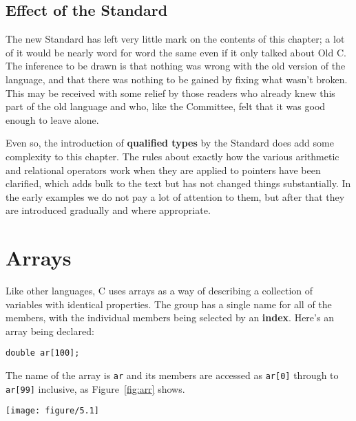   

  \subsection{Effect of the Standard}
   

   The new Standard has left very little mark on the contents of this
    chapter; a lot of it would be nearly word for word the same even if it
    only talked about Old C. The inference to be drawn is that nothing was
    wrong with the old version of the language, and that there was nothing
    to be gained by fixing what wasn't broken. This may be received with
    some relief by those readers who already knew this part of the old
    language and who, like the Committee, felt that it was good enough to
    leave alone.


   Even so, the introduction of \textbf{qualified types} by the
    Standard does add some complexity to this chapter. The rules about
    exactly how the various arithmetic and relational operators work when
    they are applied to pointers have been clarified, which adds bulk to the
    text but has not changed things substantially. In the early examples we
    do not pay a lot of attention to them, but after that they are
    introduced gradually and where appropriate.


  

 
        \section{Arrays}
        

  

  Like other languages, C uses arrays as a way of describing a collection
   of variables with identical properties. The group has a single name for
   all of the members, with the individual members being selected by an
   \textbf{index}. Here's an array being declared:


  \begin{Verbatim}
double ar[100];
\end{Verbatim}

  The name of the array is \texttt{ar} and its members are accessed
   as \texttt{ar[0]} through to \texttt{ar[99]} inclusive, as
   Figure~\ref{fig:arr} shows.


   \begin{figure*}[htb]\centering
     \texttt{[image: figure/5.1]}
     \caption*{Diagram showing an array consisting of elements labelled 'ar[0]',           'ar[1]', etc., up to 'ar[99]'.}
     \caption{\label{fig:arr}100 element array}
   \end{figure*}



